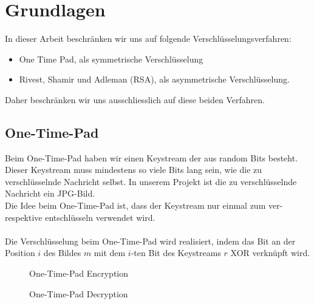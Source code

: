 \documentclass[paper=a4,fontsize=12pt]{scrartcl}
\begin{document}
\newpage 
\section{Grundlagen} 
In dieser Arbeit beschränken wir uns auf folgende Verschlüsselungsverfahren:
\begin{itemize}
  \item One Time Pad, als symmetrische Verschlüsselung
  \item Rivest, Shamir und Adleman (RSA), als asymmetrische Verschlüsselung.
\end{itemize} 
Daher beschränken wir uns ausschliesslich auf diese beiden Verfahren. 

\subsection{One-Time-Pad}
Beim One-Time-Pad haben wir einen Keystream der aus random Bits besteht.
Dieser Keystream muss mindestens so viele Bits lang sein, wie die zu verschlüsselnde Nachricht selbst.
In unserem Projekt ist die zu verschlüsselnde Nachricht ein JPG-Bild. \\
Die Idee beim One-Time-Pad ist, dass der Keystream nur einmal zum ver- respektive entschlüsseln verwendet wird. \\ \\
Die Verschlüsselung beim One-Time-Pad wird realisiert, 
indem das Bit an der Position $i$ des Bildes $m$ mit dem $i$-ten Bit des Keystreams $r$ XOR verknüpft wird.

\begin{figure}[H] 
	\centering
	\caption[One Time Pad Encryption]{One-Time-Pad Encryption}  
	\label{One-Time-Pad Encryption}  
\end{figure}
\begin{figure}[H] 
	\centering
	\caption[One Time Pad Decryption]{One-Time-Pad Decryption}  
	\label{One-Time-Pad-enc} 
\end{figure}
\end{document}
